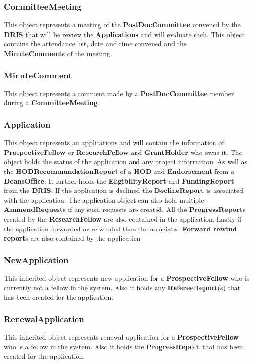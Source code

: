 \documentclass[12pt]{article}
\begin{document}
\subsubsection{CommitteeMeeting}
This object represents a meeting of the \textbf{PostDocCommittee} convened by the \textbf{DRIS} that will be review the \textbf{Applications} and will evaluate each. This object contains the attendance list, date and time convened and the \textbf{MinuteComment}s of the meeting.

\subsubsection{MinuteComment}
This object represents a comment made by a \textbf{PostDocCommittee} member during a \textbf{CommitteeMeeting}.

\subsubsection{Application}
This object represents an applications and will contain the information of \textbf{ProspectiveFellow} or \textbf{ResearchFellow} and \textbf{GrantHolder} who owns it. The object holds the status of the application and any project information. As well as the \textbf{HODRecommandationReport} of a \textbf{HOD} and \textbf{Endorsement} from a \textbf{DeansOffice}. It further holds the \textbf{EligibilityReport} and \textbf{FundingReport} from the \textbf{DRIS}. If the application is declined the \textbf{DeclineReport} is associated with the application. The application object can also hold multiple \textbf{AmmendRequest}s if any such requests are created. All the \textbf{ProgressReport}s created by the \textbf{ResearchFellow} are also contained in the application. Lastly if the application forwarded or re-winded then the associated \textbf{Forward rewind report}s are also contained by the application 

\subsubsection{NewApplication}
This inherited object represents new application for a \textbf{ProspectiveFellow} who is currently not a fellow in the system. Also it holds any \textbf{RefereeReport}(s) that has been created for the application.

\subsubsection{RenewalApplication}
This inherited object represents renewal application for a \textbf{ProspectiveFellow} who is a fellow in the system. Also it holds the \textbf{ProgressReport} that has been created for the application.
\end{document}
